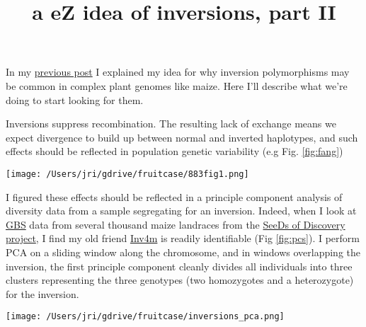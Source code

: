 \documentclass[]{article}
\begin{document}
\title{a eZ idea of inversions, part II}
\maketitle

In my \href{}{previous post} I explained my idea for why inversion polymorphisms may be common in complex plant genomes like maize. 
Here I'll describe what we're doing to start looking for them.

Inversions suppress recombination. 
The resulting lack of exchange means we expect divergence to build up between normal and inverted haplotypes, and such effects should be reflected in population genetic variability (e.g Fig. \ref{fig:fang})

\begin{SCfigure}[][h!]   
   \texttt{[image: /Users/jri/gdrive/fruitcase/883fig1.png]}
   \caption{The impact of an inversion on diversity. Figure from \href{http://www.genetics.org/content/191/3/883}{Fang et al. 2012} showing reduced haplotype diversity, elevated $F_{ST}$ between haplotypes, increased LD, and decreased rates of crossover inside a large inversion on maize chromosome 1.} 
    \label{fig:fang}
\end{SCfigure}

I figured these effects should be reflected in a principle component analysis of diversity data from a sample segregating for an inversion.  
Indeed, when I look at \href{http://www.ncbi.nlm.nih.gov/pmc/articles/PMC3087801/}{GBS} data from several thousand maize landraces from the \href{http://seedsofdiscovery.org/maize/}{SeeDs of Discovery project}, I find my old friend \href{http://gbe.oxfordjournals.org/content/5/9/1594.full}{Inv4m} is readily identifiable (Fig \ref{fig:pcs}). 
I perform PCA on a sliding window along the chromosome, and in windows overlapping the inversion, the first principle component cleanly divides all individuals into three clusters representing the three genotypes (two homozygotes and a heterozygote) for the inversion.

\begin{figure*}[h]   
  \begin{center}
   \texttt{[image: /Users/jri/gdrive/fruitcase/inversions\_pca.png]}
   \caption{ The first two principal components of a PCA on individuals from the maize SeeDs of diversity data, plotted in 5Mb windows for part of Chr. 4. You can see a high-res version at the 1Mb scale \href{}{here}.} 
    \label{fig:pcs}
  \end{center}
\end{figure*}
\end{document}
